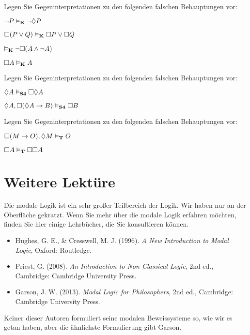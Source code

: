 \practiceproblems

\problempart
Legen Sie Gegeninterpretationen zu den folgenden falschen Behauptungen vor:
\begin{earg}
	\item $\neg P \vDash_{\mathbf{K}} \neg\Diamond P$
	\item $\Box(P \vee Q)\vDash_{\mathbf{K}} \Box P \vee \Box Q$
	\item $\vDash_{\mathbf{K}} \neg \Box (A\wedge \neg A)$
	\item $\Box A\vDash_{\mathbf{K}} A$
\end{earg}

\problempart
Legen Sie Gegeninterpretationen zu den folgenden falschen Behauptungen vor:
\begin{earg}
	\item $\Diamond A\vDash_{\mathbf{S4}} \Box\Diamond A$
	\item $\Diamond A, \Box (\Diamond A \rightarrow B)\vDash_{\mathbf{S4}}\Box B$
\end{earg}

\problempart
Legen Sie Gegeninterpretationen zu den folgenden falschen Behauptungen vor:
\begin{earg}
	\item $\Box (M\rightarrow O),\Diamond M\vDash_{\mathbf{T}} O$
	\item $\Box A\vDash_{\mathbf{T}} \Box \Box A$
\end{earg}

\section*{Weitere Lektüre}

Die modale Logik ist ein sehr großer Teilbereich der Logik. Wir haben nur an der Oberfläche gekratzt. Wenn Sie mehr über die modale Logik erfahren möchten, finden Sie hier einige Lehrbücher, die Sie konsultieren können.
\begin{itemize}
	\item Hughes, G. E., \& Cresswell, M. J. (1996). \emph{A New Introduction to Modal Logic}, Oxford: Routledge.
	\item Priest, G. (2008). \emph{An Introduction to Non-Classical Logic}, 2nd ed., Cambridge: Cambridge University Press.
	\item Garson, J. W. (2013). \emph{Modal Logic for Philosophers}, 2nd ed., Cambridge: Cambridge University Press.
\end{itemize}

Keiner dieser Autoren formuliert seine modalen Beweissysteme so, wie wir es getan haben, aber die ähnlichste Formulierung gibt Garson.

